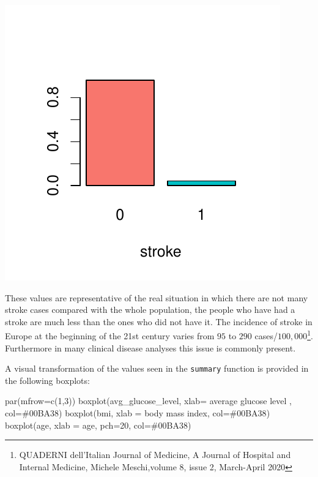 \documentclass[
]{article}
\newenvironment{Shaded}{\begin{snugshade}}{\end{snugshade}}
\newcommand{\AttributeTok}[1]{\textcolor[rgb]{0.77,0.63,0.00}{#1}}
\newcommand{\DecValTok}[1]{\textcolor[rgb]{0.00,0.00,0.81}{#1}}
\newcommand{\FunctionTok}[1]{\textcolor[rgb]{0.00,0.00,0.00}{#1}}
\newcommand{\NormalTok}[1]{#1}
\newcommand{\StringTok}[1]{\textcolor[rgb]{0.31,0.60,0.02}{#1}}
\begin{document}
\begin{center}\includegraphics{stat-project-stroke_files/figure-latex/unnamed-chunk-7-1} \end{center}

These values are representative of the real situation in which there are
not many stroke cases compared with the whole population, the people who
have had a stroke are much less than the ones who did not have it. The
incidence of stroke in Europe at the beginning of the 21st century
varies from \(95\) to \(290\) cases/\(100,000\)\footnote{QUADERNI
  dell'Italian Journal of Medicine, A Journal of Hospital and Internal
  Medicine, Michele Meschi,volume 8, issue 2, March-April 2020}.
Furthermore in many clinical disease analyses this issue is commonly
present.

A visual transformation of the values seen in the \texttt{summary}
function is provided in the following boxplots:

\begin{Shaded}
\begin{Highlighting}[]
\FunctionTok{par}\NormalTok{(}\AttributeTok{mfrow=}\FunctionTok{c}\NormalTok{(}\DecValTok{1}\NormalTok{,}\DecValTok{3}\NormalTok{))}
\FunctionTok{boxplot}\NormalTok{(avg\_glucose\_level, }\AttributeTok{xlab=} \StringTok{\textquotesingle{}average glucose level\textquotesingle{}}\NormalTok{ , }\AttributeTok{col=}\StringTok{\textquotesingle{}\#00BA38\textquotesingle{}}\NormalTok{)}
\FunctionTok{boxplot}\NormalTok{(bmi, }\AttributeTok{xlab =} \StringTok{\textquotesingle{}body mass index\textquotesingle{}}\NormalTok{, }\AttributeTok{col=}\StringTok{\textquotesingle{}\#00BA38\textquotesingle{}}\NormalTok{)}
\FunctionTok{boxplot}\NormalTok{(age, }\AttributeTok{xlab =} \StringTok{\textquotesingle{}age\textquotesingle{}}\NormalTok{, }\AttributeTok{pch=}\DecValTok{20}\NormalTok{, }\AttributeTok{col=}\StringTok{\textquotesingle{}\#00BA38\textquotesingle{}}\NormalTok{)}
\end{Highlighting}
\end{Shaded}
\end{document}

